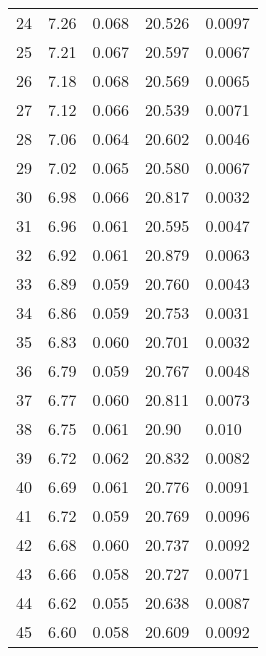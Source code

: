 \begin{table}
\begin{tabular}{c|ll|ll}
24 & 7.26 & 0.068 & 20.526 & 0.0097 \\
25 & 7.21 & 0.067 & 20.597 & 0.0067 \\
26 & 7.18 & 0.068 & 20.569 & 0.0065 \\
27 & 7.12 & 0.066 & 20.539 & 0.0071 \\
28 & 7.06 & 0.064 & 20.602 & 0.0046 \\
29 & 7.02 & 0.065 & 20.580 & 0.0067 \\
30 & 6.98 & 0.066 & 20.817 & 0.0032 \\
31 & 6.96 & 0.061 & 20.595 & 0.0047 \\
32 & 6.92 & 0.061 & 20.879 & 0.0063 \\
33 & 6.89 & 0.059 & 20.760 & 0.0043 \\
34 & 6.86 & 0.059 & 20.753 & 0.0031 \\
35 & 6.83 & 0.060 & 20.701 & 0.0032 \\
36 & 6.79 & 0.059 & 20.767 & 0.0048 \\
37 & 6.77 & 0.060 & 20.811 & 0.0073 \\
38 & 6.75 & 0.061 & 20.90 & 0.010 \\
39 & 6.72 & 0.062 & 20.832 & 0.0082 \\
40 & 6.69 & 0.061 & 20.776 & 0.0091 \\
41 & 6.72 & 0.059 & 20.769 & 0.0096 \\
42 & 6.68 & 0.060 & 20.737 & 0.0092 \\
43 & 6.66 & 0.058 & 20.727 & 0.0071 \\
44 & 6.62 & 0.055 & 20.638 & 0.0087 \\
45 & 6.60 & 0.058 & 20.609 & 0.0092 \\
               \hline
        \end{tabular}
    \end{table}
    \clearpage

